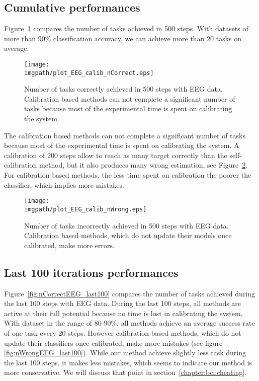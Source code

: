 \subsection{Cumulative performances}

Figure~\ref{fig:nCorrectEEG} compares the number of tasks achieved in 500 steps. With datasets of more than 90\% classification accuracy, we can achieve more than 20 tasks on average. 


\begin{figure}[!htbp]
\centering
\texttt{[image: \\imgpath/plot\_EEG\_calib\_nCorrect.eps]}
\caption{Number of tasks correctly achieved in 500 steps with EEG data. Calibration based methods can not complete a significant number of tasks because most of the experimental time is spent on calibrating the system.}
\label{fig:nCorrectEEG}
\end{figure} 

The calibration based methods can not complete a significant number of tasks because most of the experimental time is spent on calibrating the system. A calibration of 200 steps allow to reach as many target correctly than the self-calibration method, but it also produces many wrong estimation, see Figure~\ref{fig:nWrongEEG}. For calibration based methods, the less time spent on calibration the poorer the classifier, which implies more mistakes.

\begin{figure}[!htbp]
\centering
\texttt{[image: \\imgpath/plot\_EEG\_calib\_nWrong.eps]}
\caption{Number of tasks incorrectly achieved in 500 steps with EEG data. Calibration based methods, which do not update their models once calibrated, make more errors.}
\label{fig:nWrongEEG}
\end{figure}

\subsection{Last 100 iterations performances}

Figure~\ref{fig:nCorrectEEG_last100} compares the number of tasks achieved during the last 100 steps with EEG data. During the last 100 steps, all methods are active at their full potential because no time is lost in calibrating the system. With dataset in the range of 80-90\%, all methods achieve an average success rate of one task every 20 steps. However calibration based methods, which do not update their classifiers once calibrated, make more mistakes (see figure \ref{fig:nWrongEEG_last100}). While our method achieve slightly less task during the last 100 steps, it makes less mistakes, which seems to indicate our method is more conservative. We will discuss that point in section~\ref{chapter:bci:cheating}.

